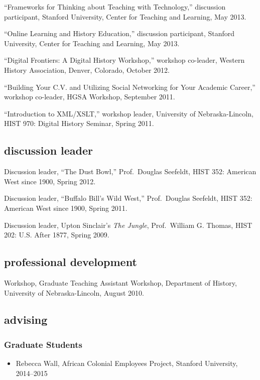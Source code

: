 ``Frameworks for Thinking about Teaching with Technology,'' discussion
participant, Stanford University, Center for Teaching and Learning, May
2013.

``Online Learning and History Education,'' discussion participant,
Stanford University, Center for Teaching and Learning, May 2013.

``Digital Frontiers: A Digital History Workshop,'' workshop co-leader,
Western History Association, Denver, Colorado, October 2012.

``Building Your C.V. and Utilizing Social Networking for Your Academic
Career,'' workshop co-leader, HGSA Workshop, September 2011.

``Introduction to XML/XSLT,'' workshop leader, University of
Nebraska-Lincoln, HIST 970: Digital History Seminar, Spring 2011.

\subsection{discussion leader}\label{discussion-leader}

Discussion leader, ``The Dust Bowl,'' Prof.~Douglas Seefeldt, HIST 352:
American West since 1900, Spring 2012.

Discussion leader, ``Buffalo Bill's Wild West,'' Prof.~Douglas Seefeldt,
HIST 352: American West since 1900, Spring 2011.

Discussion leader, Upton Sinclair's \emph{The Jungle}, Prof.~William G.
Thomas, HIST 202: U.S. After 1877, Spring 2009.

\subsection{professional development}\label{professional-development-1}

Workshop, Graduate Teaching Assistant Workshop, Department of History,
University of Nebraska-Lincoln, August 2010.

\subsection{advising}\label{advising}

\subsubsection{Graduate Students}\label{graduate-students}

\begin{itemize}
\tightlist
\item
  Rebecca Wall, African Colonial Employees Project, Stanford University,
  2014--2015
\end{itemize}

